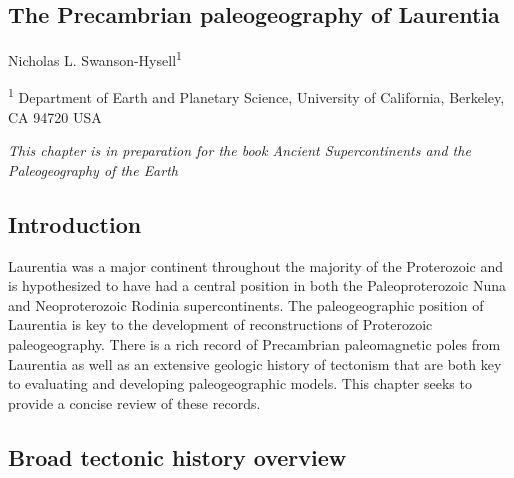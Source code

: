 \documentclass[11pt,letterpaper]{article}
\begin{document}
\begin{flushleft}
\section{The Precambrian paleogeography of Laurentia}

Nicholas L. Swanson-Hysell\textsuperscript{1}

\bigskip

\textsuperscript{1} Department of Earth and Planetary Science, University of California, Berkeley, CA 94720 USA

\end{flushleft}

\noindent\textit{This chapter is in preparation for the book Ancient Supercontinents and the Paleogeography of the Earth}

\linenumbers

\subsection{Introduction}

Laurentia was a major continent throughout the majority of the Proterozoic and is hypothesized to have had a central position in both the Paleoproterozoic Nuna and Neoproterozoic Rodinia supercontinents. The paleogeographic position of Laurentia is key to the development of reconstructions of Proterozoic paleogeography. There is a rich record of Precambrian paleomagnetic poles from Laurentia as well as an extensive geologic history of tectonism that are both key to evaluating and developing paleogeographic models. This chapter seeks to provide a concise review of these records.

\subsection{Broad tectonic history overview}
\end{document}
